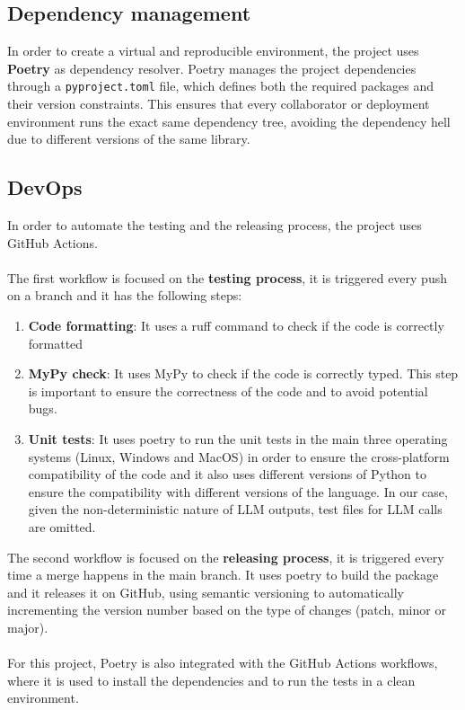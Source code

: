 \documentclass[12pt,a4paper,openright,twoside]{book}
\begin{document}
\subsection{Dependency management}
In order to create a virtual and reproducible environment, the project uses \textbf{Poetry} as dependency resolver.
Poetry manages the project dependencies through a \texttt{pyproject.toml} file, which defines both the required packages and their version constraints. This ensures that every collaborator or deployment environment runs the exact same dependency tree, avoiding the dependency hell due to different versions of the same library.

\subsection{DevOps}
In order to automate the testing and the releasing process, the project uses GitHub Actions.
\\\\
The first workflow is focused on the \textbf{testing process}, it is triggered every push on a branch and it has the following steps:
\begin{enumerate}
    \item \textbf{Code formatting}: It uses a ruff command to check if the code is correctly formatted
    \item \textbf{MyPy check}: It uses MyPy to check if the code is correctly typed. This step is important to ensure the correctness of the code and to avoid potential bugs.
    \item \textbf{Unit tests}: It uses poetry to run the unit tests in the main three operating systems (Linux, Windows and MacOS) in order to ensure the cross-platform compatibility of the code and it also uses different versions of Python to ensure the compatibility with different versions of the language. In our case, given the non-deterministic nature of LLM outputs, test files for LLM calls are omitted.
\end{enumerate}

The second workflow is focused on the \textbf{releasing process}, it is triggered every time a merge happens in the main branch. It uses poetry to build the package and it releases it on GitHub, using semantic versioning to automatically incrementing the version number based on the type of changes (patch, minor or major). 
\\\\
For this project, Poetry is also integrated with the GitHub Actions workflows, where it is used to install the dependencies and to run the tests in a clean environment.
\end{document}
